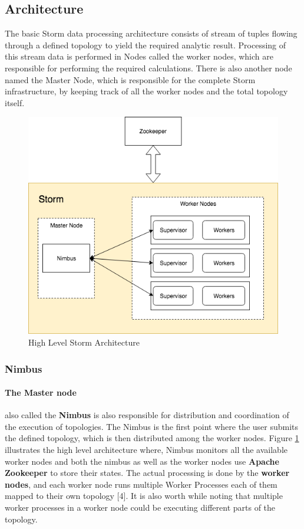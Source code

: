 \documentclass[runningheads,a4paper]{llncs}[2015/06/24]
\begin{document}
\subsection{Architecture}
The basic Storm data processing architecture consists of stream of tuples flowing through a defined topology to yield the required analytic result. Processing of this stream data is performed in Nodes called the worker nodes, which are responsible for performing the required calculations. There is also another node named the Master Node, which is responsible for the complete Storm infrastructure,  by keeping track of all the worker nodes and the total topology itself.

\begin{figure}
  \begin{center}
    \includegraphics[width=.7\textwidth]{arch.png}
    \caption{High Level Storm Architecture}
    \label{fig:arch}
   \end{center}
\end{figure}

\subsubsection{Nimbus}

\paragraph{The Master node} also called the \textbf{Nimbus} is also responsible for distribution and coordination of the execution of topologies. The Nimbus is the first point where the user submits the defined topology, which is then distributed among the worker nodes.  Figure \ref{fig:arch} illustrates the high level architecture where, Nimbus monitors all the available worker nodes and both the nimbus as well as the worker nodes use \textbf{Apache Zookeeper} to store their states. The actual processing is done by the \textbf{worker nodes}, and each worker node runs multiple Worker Processes each of them mapped to their own topology [4]. It is also worth while noting that multiple worker processes in a worker node could be executing different parts of the topology.
\end{document}
